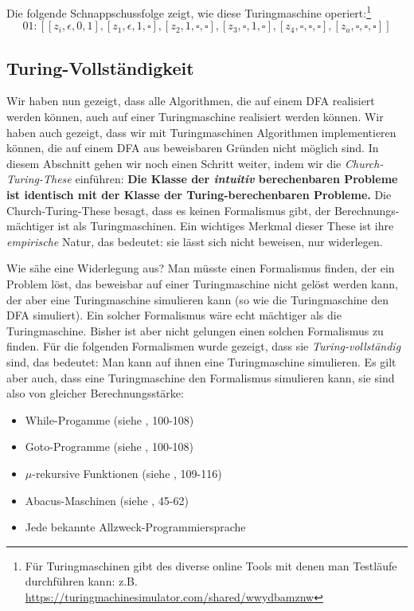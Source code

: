 Die folgende Schnappschussfolge zeigt, wie diese Turingmaschine operiert:\footnote{
    Für Turingmaschinen gibt des diverse online Tools mit denen man Testläufe durchführen kann:
    z.B. \url{https://turingmachinesimulator.com/shared/wwydbamznw}
}
\[
    01: [[z_i, \epsilon, 0, 1],
         [z_1, \epsilon, 1, \square],
         [z_2, 1, \square, \square],
         [z_3, \square, 1, \square],
         [z_4, \square, \square, \square],
         [z_a, \square, \square, \square]]
\]


\subsection{Turing-Vollständigkeit}\label{turingVollstaendigkeit}

Wir haben nun gezeigt,
dass alle Algorithmen,
die auf einem DFA realisiert werden können,
auch auf einer Turingmaschine realisiert werden können.
Wir haben auch gezeigt,
dass wir mit Turingmaschinen Algorithmen implementieren können,
die auf einem DFA aus beweisbaren Gründen nicht möglich sind.
In diesem Abschnitt gehen wir noch einen Schritt weiter,
indem wir die \emph{Church-Turing-These} einführen:
\textbf{Die Klasse der \emph{intuitiv} berechenbaren Probleme
ist identisch mit der Klasse der Turing-berechenbaren Probleme.}
Die Church-Turing-These besagt,
dass es keinen Formalismus gibt,
der Berechnungs-mächtiger ist als Turingmaschinen.
Ein wichtiges Merkmal dieser These ist ihre \emph{empirische} Natur,
das bedeutet: sie lässt sich nicht beweisen, nur widerlegen.

Wie sähe eine Widerlegung aus?
Man müsste einen Formalismus finden,
der ein Problem löst,
das beweisbar auf einer Turingmaschine nicht gelöst werden kann,
der aber eine Turingmaschine simulieren kann (so wie die Turingmaschine den DFA simuliert).
Ein solcher Formalismus wäre echt mächtiger als die Turingmaschine.
Bisher ist aber nicht gelungen einen solchen Formalismus zu finden.
Für die folgenden Formalismen wurde gezeigt,
dass sie \emph{Turing-vollständig} sind,
das bedeutet:
Man kann auf ihnen eine Turingmaschine simulieren. 
Es gilt aber auch,
dass eine Turingmaschine den Formalismus simulieren kann,
sie sind also von gleicher Berechnungsstärke:
\begin{itemize}
    \item While-Progamme (siehe \cite{schoening}, 100-108)
    \item Goto-Programme (siehe \cite{schoening}, 100-108)
    \item $\mu$-rekursive Funktionen (siehe \cite{schoening}, 109-116)
    \item Abacus-Maschinen (siehe \cite{cal}, 45-62)
    \item Jede bekannte Allzweck-Programmiersprache
\end{itemize}


